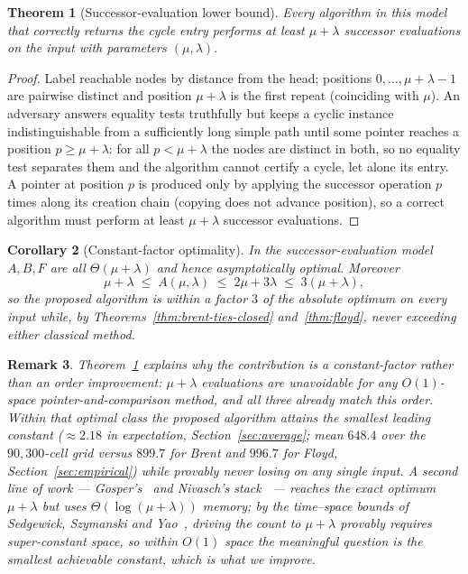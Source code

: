 \documentclass[11pt]{article}
\newtheorem{theorem}{Theorem}[section]
\newtheorem{corollary}[theorem]{Corollary}
\newtheorem{remark}[theorem]{Remark}
\begin{document}
\begin{theorem}[Successor-evaluation lower bound]
\label{thm:lowerbound}
Every algorithm in this model that correctly returns the cycle entry performs at
least $\mu+\lambda$ successor evaluations on the input with parameters
$(\mu,\lambda)$.
\end{theorem}

\begin{proof}
Label reachable nodes by distance from the head; positions
$0,\dots,\mu+\lambda-1$ are pairwise distinct and position $\mu+\lambda$ is the
first repeat (coinciding with $\mu$). An adversary answers equality tests
truthfully but keeps a cyclic instance indistinguishable from a sufficiently long
simple path until some pointer reaches a position $p\ge\mu+\lambda$: for all
$p<\mu+\lambda$ the nodes are distinct in both, so no equality test separates
them and the algorithm cannot certify a cycle, let alone its entry. A pointer at
position $p$ is produced only by applying the successor operation $p$ times along
its creation chain (copying does not advance position), so a correct algorithm
must perform at least $\mu+\lambda$ successor evaluations.
\end{proof}

\begin{corollary}[Constant-factor optimality]
\label{cor:optimal}
In the successor-evaluation model $A,B,F$ are all $\Theta(\mu+\lambda)$ and hence
asymptotically optimal. Moreover
\[
\mu+\lambda\;\le\;A(\mu,\lambda)\;\le\;2\mu+3\lambda\;\le\;3(\mu+\lambda),
\]
so the proposed algorithm is within a factor $3$ of the absolute optimum on every
input while, by Theorems~\ref{thm:brent-ties-closed} and~\ref{thm:floyd}, never
exceeding either classical method.
\end{corollary}

\begin{remark}
Theorem~\ref{thm:lowerbound} explains why the contribution is a constant-factor
rather than an order improvement: $\mu+\lambda$ evaluations are unavoidable for
any $O(1)$-space pointer-and-comparison method, and all three already match this
order. Within that optimal class the proposed algorithm attains the smallest
leading constant ($\approx 2.18$ in expectation, Section~\ref{sec:average};
mean $648.4$ over the $90{,}300$-cell grid versus $899.7$ for Brent and $996.7$
for Floyd, Section~\ref{sec:empirical}) while provably never losing on any single
input. A second line of work --- Gosper's~\cite{gosper1972} and Nivasch's
stack~\cite{nivasch2004} --- reaches the exact optimum $\mu+\lambda$ but uses
$\Theta(\log(\mu+\lambda))$ memory; by the time--space bounds of Sedgewick,
Szymanski and Yao~\cite{ssy1982}, driving the count to $\mu+\lambda$ provably
requires super-constant space, so within $O(1)$ space the meaningful question is
the smallest achievable constant, which is what we improve.
\end{remark}
\end{document}
